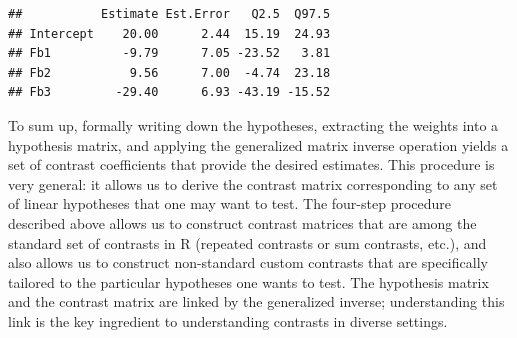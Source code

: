\documentclass[12pt,]{krantz}
\newenvironment{Shaded}{\begin{snugshade}}{\end{snugshade}}
\newcommand{\KeywordTok}[1]{\textcolor[rgb]{0.13,0.29,0.53}{\textbf{#1}}}
\newcommand{\DataTypeTok}[1]{\textcolor[rgb]{0.13,0.29,0.53}{#1}}
\newcommand{\DecValTok}[1]{\textcolor[rgb]{0.00,0.00,0.81}{#1}}
\newcommand{\StringTok}[1]{\textcolor[rgb]{0.31,0.60,0.02}{#1}}
\newcommand{\OperatorTok}[1]{\textcolor[rgb]{0.81,0.36,0.00}{\textbf{#1}}}
\newcommand{\NormalTok}[1]{#1}
\theoremstyle{definition}
\theoremstyle{definition}
\theoremstyle{definition}
\theoremstyle{remark}
\begin{document}
\begin{Shaded}
\end{Shaded}

\begin{verbatim}
##           Estimate Est.Error   Q2.5  Q97.5
## Intercept    20.00      2.44  15.19  24.93
## Fb1          -9.79      7.05 -23.52   3.81
## Fb2           9.56      7.00  -4.74  23.18
## Fb3         -29.40      6.93 -43.19 -15.52
\end{verbatim}

To sum up, formally writing down the hypotheses, extracting the weights
into a hypothesis matrix, and applying the generalized matrix inverse
operation yields a set of contrast coefficients that provide the desired
estimates. This procedure is very general: it allows us to derive the
contrast matrix corresponding to any set of linear hypotheses that one
may want to test. The four-step procedure described above allows us to
construct contrast matrices that are among the standard set of contrasts
in R (repeated contrasts or sum contrasts, etc.), and also allows us to
construct non-standard custom contrasts that are specifically tailored
to the particular hypotheses one wants to test. The hypothesis matrix
and the contrast matrix are linked by the generalized inverse;
understanding this link is the key ingredient to understanding contrasts
in diverse settings.
\end{document}
